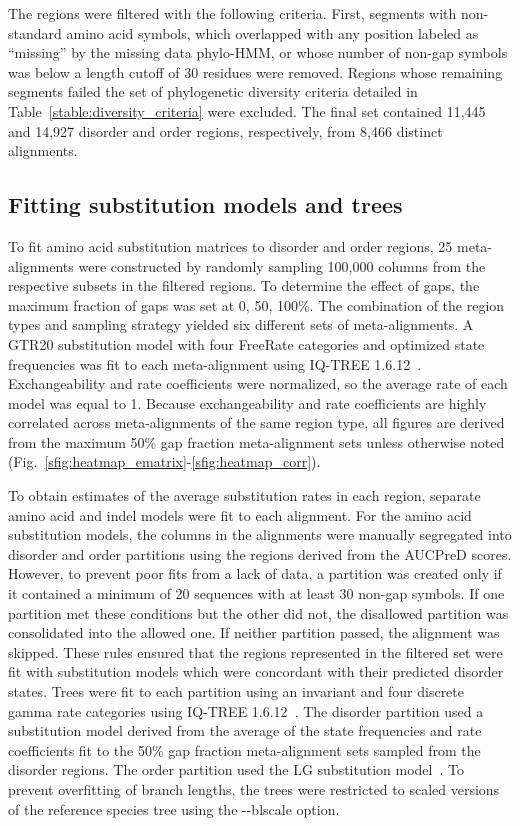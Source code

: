 The regions were filtered with the following criteria. First, segments with non-standard amino acid symbols, which overlapped with any position labeled as ``missing'' by the missing data phylo-HMM, or whose number of non-gap symbols was below a length cutoff of 30 residues were removed. Regions whose remaining segments failed the set of phylogenetic diversity criteria detailed in Table~\ref{stable:diversity_criteria} were excluded. The final set contained 11,445 and 14,927 disorder and order regions, respectively, from 8,466 distinct alignments.

\subsection{Fitting substitution models and trees}
To fit amino acid substitution matrices to disorder and order regions, 25 meta-alignments were constructed by randomly sampling 100,000 columns from the respective subsets in the filtered regions. To determine the effect of gaps, the maximum fraction of gaps was set at 0, 50, 100\%. The combination of the region types and sampling strategy yielded six different sets of meta-alignments. A GTR20 substitution model with four FreeRate categories and optimized state frequencies was fit to each meta-alignment using IQ-TREE 1.6.12~\cite{Nguyen2014}. Exchangeability and rate coefficients were normalized, so the average rate of each model was equal to 1. Because exchangeability and rate coefficients are highly correlated across meta-alignments of the same region type, all figures are derived from the maximum 50\% gap fraction meta-alignment sets unless otherwise noted (Fig.~\ref{sfig:heatmap_ematrix}-\ref{sfig:heatmap_corr}).

To obtain estimates of the average substitution rates in each region, separate amino acid and indel models were fit to each alignment. For the amino acid substitution models, the columns in the alignments were manually segregated into disorder and order partitions using the regions derived from the AUCPreD scores. However, to prevent poor fits from a lack of data, a partition was created only if it contained a minimum of 20 sequences with at least 30 non-gap symbols. If one partition met these conditions but the other did not, the disallowed partition was consolidated into the allowed one. If neither partition passed, the alignment was skipped. These rules ensured that the regions represented in the filtered set were fit with substitution models which were concordant with their predicted disorder states. Trees were fit to each partition using an invariant and four discrete gamma rate categories using IQ-TREE 1.6.12~\cite{Yang1994}. The disorder partition used a substitution model derived from the average of the state frequencies and rate coefficients fit to the 50\% gap fraction meta-alignment sets sampled from the disorder regions. The order partition used the LG substitution model~\cite{Le2008}. To prevent overfitting of branch lengths, the trees were restricted to scaled versions of the reference species tree using the -{}-blscale option.

